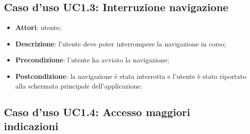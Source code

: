 \documentclass[../AnalisiDeiRequisiti.tex]{subfiles}
\begin{document}
\subsection{Caso d'uso UC1.3: Interruzione navigazione}
\begin{itemize}
\item \textbf{Attori}: utente;
\item \textbf{Descrizione}: l'utente deve poter interrompere la navigazione in corso; 
      \item \textbf{Precondizione}: l'utente ha avviato la navigazione;
    \item \textbf{Postcondizione}: la navigazione è stata interrotta e l'utente è stato riportato alla schermata principale dell'applicazione.
  \end{itemize}
\hypertarget{UC1.4}{}
\subsection{Caso d'uso UC1.4: Accesso maggiori indicazioni}
\end{document}
